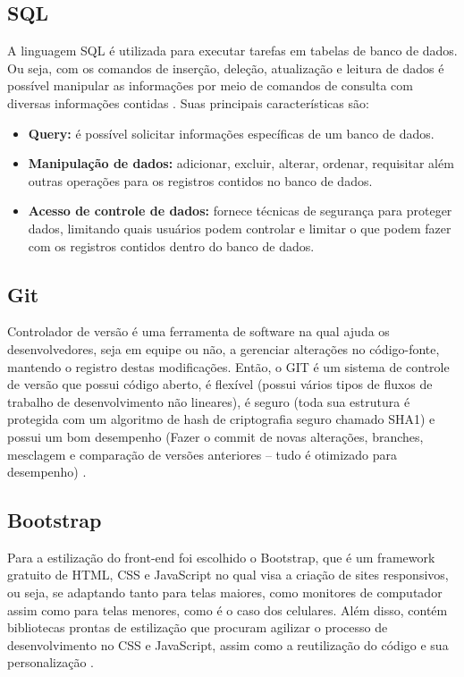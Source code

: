 \subsection{SQL}
A linguagem SQL é utilizada para executar tarefas em tabelas de banco de dados. Ou seja, com os comandos de inserção, deleção, atualização e leitura de dados é possível manipular as informações por meio de comandos de consulta com diversas informações contidas \cite{HEUSER}. Suas principais características são:
\begin{itemize}
    \item \textbf{Query:} é possível solicitar informações específicas de um banco de dados.
    \item \textbf{Manipulação de dados:} adicionar, excluir, alterar, ordenar, requisitar além outras operações para os registros contidos no banco de dados.
    \item \textbf{Acesso de controle de dados:} fornece técnicas de segurança para proteger dados, limitando quais usuários podem controlar e limitar o que podem fazer com os registros contidos dentro do banco de dados.
\end{itemize}
\subsection{Git}
Controlador de versão é uma ferramenta de software na qual ajuda os desenvolvedores, seja em equipe ou não, a gerenciar alterações no código-fonte, mantendo o registro destas modificações. Então, o GIT é um sistema de controle de versão que possui código aberto, é flexível (possui vários tipos de fluxos de trabalho de desenvolvimento não lineares), é seguro (toda sua estrutura é protegida com um algoritmo de hash de criptografia seguro chamado SHA1) e possui um bom desempenho (Fazer o commit de novas alterações, branches, mesclagem e comparação de versões anteriores – tudo é otimizado para desempenho) \cite{SANTACROCE}.
\subsection{Bootstrap}
Para a estilização do front-end foi escolhido o Bootstrap, que é um framework gratuito de HTML, CSS e JavaScript no qual visa a criação de sites responsivos, ou seja, se adaptando tanto para telas maiores, como monitores de computador assim como para telas menores, como é o caso dos celulares. Além disso, contém bibliotecas prontas de estilização que procuram agilizar o processo de desenvolvimento no CSS e JavaScript, assim como a reutilização do código e sua personalização \cite{SPURLOCK}.


